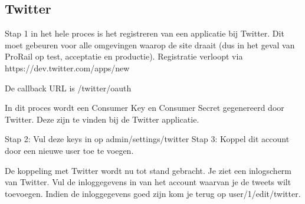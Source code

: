 \subsection{Twitter}

Stap 1 in het hele proces is het registreren van een applicatie bij Twitter. Dit moet gebeuren voor alle omgevingen waarop de site draait (dus in het geval van ProRail op test, acceptatie en productie). Registratie verloopt via https://dev.twitter.com/apps/new

De callback URL is /twitter/oauth

In dit proces wordt een Consumer Key en Consumer Secret gegenereerd door Twitter. Deze zijn te vinden bij de Twitter applicatie.

Stap 2: Vul deze keys in op admin/settings/twitter
Stap 3: Koppel dit account  door een nieuwe user toe te voegen.

De koppeling met Twitter wordt nu tot stand gebracht. Je ziet een inlogscherm van Twitter. Vul de inloggegevens in van het account waarvan je de tweets wilt toevoegen. Indien de inloggegevens goed zijn kom je terug op user/1/edit/twitter.
